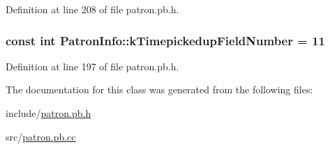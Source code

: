 Definition at line 208 of file patron.\-pb.\-h.

\hypertarget{classPatronInfo_a7abc29d4863fc09c1efa54270b7a8da1}{
\subsubsection[{k\-Timepickedup\-Field\-Number}]{\setlength{\rightskip}{0pt plus 5cm}const int Patron\-Info\-::k\-Timepickedup\-Field\-Number = 11\hspace{0.3cm}{\ttfamily [static]}}}\label{classPatronInfo_a7abc29d4863fc09c1efa54270b7a8da1}


Definition at line 197 of file patron.\-pb.\-h.



The documentation for this class was generated from the following files\-:\begin{DoxyCompactItemize}
\item 
include/\hyperlink{patron_8pb_8h}{patron.\-pb.\-h}\item 
src/\hyperlink{patron_8pb_8cc}{patron.\-pb.\-cc}\end{DoxyCompactItemize}
